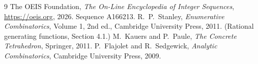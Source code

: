 \documentclass[11pt,a4paper]{article}
\theoremstyle{plain}
\theoremstyle{definition}
\begin{document}
\begin{thebibliography}{9}
 The OEIS Foundation, \emph{The On-Line Encyclopedia of Integer
Sequences}, \url{https://oeis.org}, 2026. Sequence A166213.
 R.~P.~Stanley, \emph{Enumerative Combinatorics}, Volume 1, 2nd ed.,
Cambridge University Press, 2011. (Rational generating functions, Section 4.1.)
 M.~Kauers and P.~Paule, \emph{The Concrete Tetrahedron}, Springer, 2011.
 P.~Flajolet and R.~Sedgewick, \emph{Analytic Combinatorics}, Cambridge
University Press, 2009.
\end{thebibliography}
\end{document}

